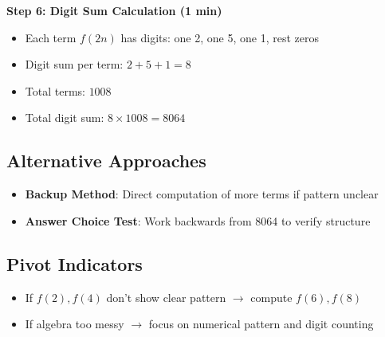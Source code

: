 \documentclass[]{article}
\begin{document}
\begin{solutionbox}
\textbf{Step 6: Digit Sum Calculation (1 min)}
\begin{itemize}[leftmargin=*]
    \item Each term $f(2n)$ has digits: one 2, one 5, one 1, rest zeros
    \item Digit sum per term: $2 + 5 + 1 = 8$
    \item Total terms: $1008$
    \item Total digit sum: $8 \times 1008 = 8064$
\end{itemize}

\subsection*{Alternative Approaches}
\begin{itemize}[leftmargin=*]
    \item \textbf{Backup Method}: Direct computation of more terms if pattern unclear
    \item \textbf{Answer Choice Test}: Work backwards from 8064 to verify structure
\end{itemize}

\subsection*{Pivot Indicators}
\begin{itemize}[leftmargin=*]
    \item If $f(2), f(4)$ don't show clear pattern $\to$ compute $f(6), f(8)$
    \item If algebra too messy $\to$ focus on numerical pattern and digit counting
\end{itemize}
\end{solutionbox}
\end{document}
